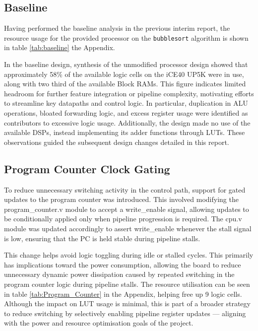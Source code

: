 \documentclass[a4paper,10pt]{article}
\begin{document}
\subsection{Baseline}
\label{sec:Baseline}

Having performed the baseline analysis in the previous interim report,
the resource usage for the provided processor on the \texttt{bubblesort}
algorithm is shown in table \ref{tab:baseline} the Appendix.

In the baseline design, 
synthesis of the unmodified processor design showed that approximately 
58\% of the available logic cells on the iCE40 UP5K were in use,
along with two third of the available Block RAMs. 
This figure indicates limited headroom for 
further feature integration or pipeline complexity, 
motivating efforts to streamline key datapaths and control logic. 
In particular, duplication in ALU operations, bloated forwarding logic, 
and excess register usage were identified 
as contributors to excessive logic usage. 
Additionally, the design made no use of the available DSPs,
instead implementing its adder functions through LUTs.
These observations guided the subsequent design changes detailed in this report.

\subsection{Program Counter Clock Gating}
\label{sec:Program_Counter_Clock_Gating}

To reduce unnecessary switching activity in the control path, 
support for gated updates to the program counter was introduced. 
This involved modifying the program\_counter.v module 
to accept a write\_enable signal, 
allowing updates to be conditionally applied 
only when pipeline progression is required. 
The cpu.v module was updated accordingly to assert write\_enable 
whenever the stall signal is low, 
ensuring that the PC is held stable during pipeline stalls.

This change helps avoid logic toggling during idle or stalled cycles. 
This primarily has implications toward the power consumption, 
allowing the board to reduce unnecessary dynamic power dissipation 
caused by repeated switching in the program counter logic during pipeline stalls. 
The resource utilisation can be seen in 
table \ref{tab:Program_Counter} in the Appendix,
helping free up 9 logic cells.
Although the impact on LUT usage is minimal, 
this is part of a broader strategy to reduce switching 
by selectively enabling pipeline register updates — 
aligning with the power and resource optimisation goals of the project.
\end{document}
